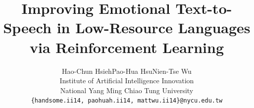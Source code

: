 \documentclass{article}
\title{Improving Emotional Text-to-Speech in Low-Resource Languages via Reinforcement Learning}
\author{%
  Hao-Chun Hsieh\quad Pao-Hua Hsu\quad Nien-Tse Wu\\
  Institute of Artificial Intelligence Innovation\\
  National Yang Ming Chiao Tung University\\
  \texttt{\{handsome.ii14, paohuah.ii14, mattwu.ii14\}@nycu.edu.tw}
}
\begin{document}
\maketitle














\newpage
{
\small


}
\end{document}
